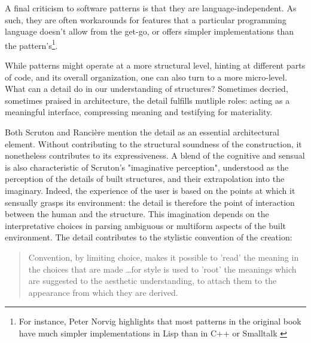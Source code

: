 A final criticism to software patterns is that they are language-independent. As such, they are often workarounds for features that a particular programming language doesn't allow from the get-go, or offers simpler implementations than the pattern's\footnote{For instance, Peter Norvig highlights that most patterns in the original book have much simpler implementations in Lisp than in C++ or Smalltalk \citep{norvig_design_1998}}.

While patterns might operate at a more structural level, hinting at different parts of code, and its overall organization, one can also turn to a more micro-level. What can a detail do in our understanding of structures? Sometimes decried, sometimes praised in architecture, the detail fulfills mutliple roles: acting as a meaningful interface, compressing meaning and testifying for materiality.

Both Scruton and Rancière mention the detail as an essential architectural element. Without contributing to the structural soundness of the construction, it nonetheless contributes to its expressiveness. A blend of the cognitive and sensual is also characteristic of Scruton's "imaginative perception", understood as the perception of the details of built structures, and their extrapolation into the imaginary. Indeed, the experience of the user is based on the points at which it sensually grasps its environment: the detail is therefore the point of interaction between the human and the structure. This imagination depends on the interpretative choices in parsing ambiguous or multiform aspects of the built environment. The detail contributes to the stylistic convention of the creation:

\begin{quote}
    Convention, by limiting choice, makes it possible to 'read' the meaning in the choices that are made \dots for style is used to 'root' the meanings which are suggested to the aesthetic understanding, to attach them to the appearance from which they are derived. \citep{scruton_aesthetics_2013}
\end{quote}

